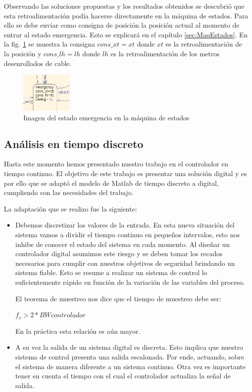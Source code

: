 \documentclass[journal]{IEEEtran}
\begin{document}
Observando las soluciones propuestas y los resultados obtenidos se descubrió que esta 
retroalimentación podía hacerse directamente en la máquina de estados. Para ello se debe
enviar como consigna de posición la posición actual al momento de entrar al estado 
emergencia.
Esto se explicará en el capítulo \ref{sec:MaqEstados}. En la fig. \ref{fig:paradaemergencia} se muestra
la consigna $cons\_xt=xt$ donde $xt$ es la retroalimentación de la posición y $cons\_lh=lh$
donde $lh$ es la retroalimentación de los metros desenrollados de cable.

\begin{figure}[!t]
 \centering
  \includegraphics[width=1in]{parad_de_emergencia_state.jpeg}
  \caption{Imagen del estado emergencia en la máquina de estados}
  \label{fig:paradaemergencia}
\end{figure}


\subsection{Análisis en tiempo discreto}
Hasta este momento hemos presentado nuestro trabajo en el controlador en tiempo continuo.
El objetivo de este trabajo es presentar una solución digital y es por ello que se adaptó
el modelo de Matlab de tiempo discreto a digital, cumpliendo con las necesidades del
trabajo. 

La adaptación que se realizo fue la siguiente:
\begin{itemize}
 \item Debemos discretizar los valores de la entrada. En esta nueva situación del sistema 
vamos a dividir el tiempo continuo en pequeños intervalos, esto nos inhibe de conocer
el estado del sistema en cada momento. Al diseñar un controlador digital asumimos este
riesgo y se deben tomar los recados necesarios para cumplir con nuestros objetivos de 
seguridad brindando un sistema fiable. Esto se resume a realizar un sistema de control 
lo suficientemente rápido en función de la variación de las variables del proceso.

El teorema de muestreo nos dice que el tiempo de muestreo debe ser:

$ f_s > 2*BWcontrolador $

En la práctica esta relación es aún mayor.

\item A su vez la salida de un sistema digital es discreta. Esto implica 
que nuestro sistema de control presenta una salida escalonada. Por ende, 
actuando, sobre el sistema de manera diferente a un sistema continuo. Otra 
vez es importante tener en cuenta el tiempo con el cual el controlador actualiza
la señal de salida.
\end{itemize}
\end{document}
